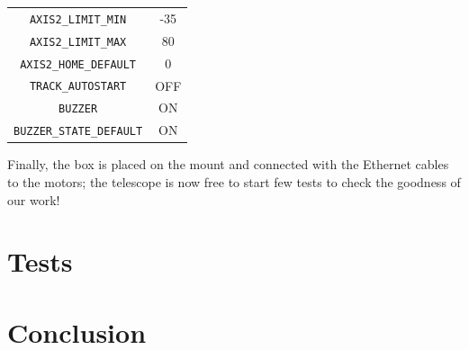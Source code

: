 \documentclass{article}
\begin{document}
\begin{multicols}{2}
\begin{minipage}
\begin{tabular}{cc}
                \texttt{AXIS2\_LIMIT\_MIN} & -35 \\
                \texttt{AXIS2\_LIMIT\_MAX} & 80 \\
                \texttt{AXIS2\_HOME\_DEFAULT} & 0\\
                \texttt{TRACK\_AUTOSTART} & OFF \\
                \texttt{BUZZER} & ON \\
                \texttt{BUZZER\_STATE\_DEFAULT} & ON\\
            \end{tabular}
            \label{fig:config_h}
        \end{minipage}

        Finally, the box is placed on the mount and connected with the Ethernet cables to the motors;
        the telescope is now free to start few tests to check the goodness of our work!

        \section{Tests}

        \section{Conclusion}

    \end{multicols}
\end{document}
